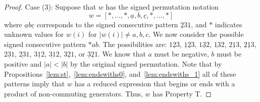\begin{proposition}
\begin{proof}
	Case (3): Suppose that $w$ has the signed permutation notation \[w=[\ast, \ldots,\ast, \underline{a},b,\underline{c}, \ast, \ldots, \ast]\] where $\underline{a}b\underline{c}$ corresponds to the signed consecutive pattern $\underline{2}3\underline{1}$, and $\ast$ indicates unknown values for $w(i)$ for $|w(i)|\neq a,b,c$. We now consider the possible signed consecutive pattern $\ast ab$. The possibilities are: $1 \underline{2} 3$, $\underline{1} \underline{2} 3$, $1\underline{3}2$, $\underline{13}2$,  $2 \underline{1} 3$, $\underline{2} \underline{1} 3$, $2 \underline{3}1$, $\underline{23}1$, $3 \underline{1}2$, $\underline{31}2$, $3 \underline{2} 1$, or $\underline{3} \underline{2} 1$. We know that $a$ must be negative, $b$ must be positive and $|a|<|b|$ by the original signed permutation. Note that by Propositions~\ref{lem:st},~\ref{lem:endswiths0}, and~\ref{lem:endswiths_1} all of these patterns imply that $w$ has a reduced expression that begins or ends with a product of non-commuting generators. Thus, $w$ has Property T. 
%
\end{proof}	
\end{proposition}

